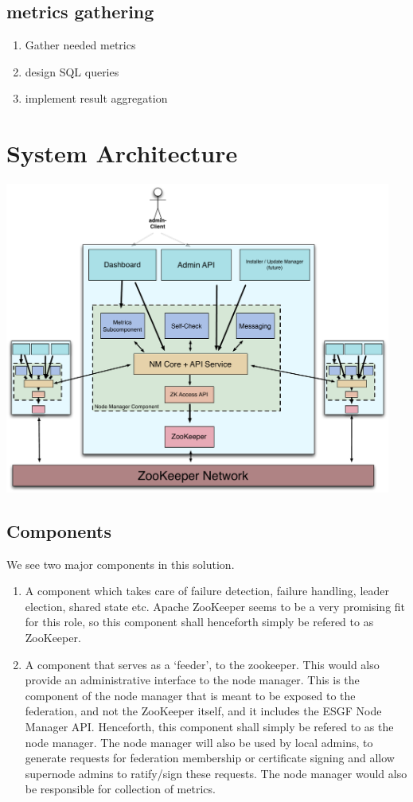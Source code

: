 \documentclass[oneside,12pt]{memoir}
\begin{document}
\subsection{metrics gathering}
\begin{enumerate}
\item Gather needed metrics
\item design SQL queries
\item  implement result aggregation
\end{enumerate}



\section{System Architecture}
\begin{center}
\includegraphics[width=5in]{presentation/NM-design.pdf}
\end{center}

\subsection{Components}
We see two major components in this solution.
\begin{enumerate}
\item 
A component which takes care of failure detection, failure handling, leader election, shared state etc.
Apache ZooKeeper seems to be a very promising fit for this role, so this component shall henceforth simply be refered to as ZooKeeper.
\item
A component that serves as a `feeder', to the zookeeper. This would also provide an administrative interface to the node manager. This is the component of the node manager that is meant to be exposed to the federation, and not the ZooKeeper itself, and it includes the ESGF Node Manager API. Henceforth, this component shall simply be refered to as the node manager. The node manager will also be used by local admins, to generate requests for federation membership or certificate signing and allow supernode admins to ratify/sign these requests. The node manager would also be responsible for collection of metrics.
\end{enumerate}
\end{document}
